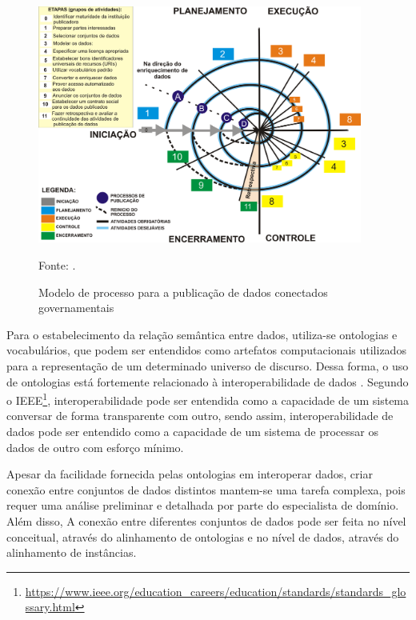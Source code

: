 \begin{figure}[!ht]
	\centering
	\includegraphics[width=0.95\textwidth]{./imagens/modelo-de-processo.png}\\
    \caption{Modelo de processo para a publicação de dados conectados governamentais}
	\footnotesize{Fonte: \cite{Avila2015}.}
	\label{fig:modelo_processo}
\end{figure}

Para o estabelecimento da relação semântica entre dados, utiliza-se ontologias e vocabulários, que podem ser entendidos como artefatos computacionais utilizados para a representação de um determinado universo de discurso. Dessa forma, o uso de ontologias está fortemente relacionado à interoperabilidade de dados \cite{guarino1998formal, simon2004using, farinelli2013papel}. Segundo o IEEE\footnote{\url{https://www.ieee.org/education_careers/education/standards/standards_glossary.html}}, interoperabilidade pode ser entendida como a capacidade de um sistema conversar de forma transparente com outro, sendo assim, interoperabilidade de dados pode ser entendido como a capacidade de um sistema de processar os dados de outro com esforço mínimo. 

Apesar da facilidade fornecida pelas ontologias em interoperar dados, criar conexão entre conjuntos de dados distintos mantem-se uma tarefa complexa, pois requer uma análise preliminar e detalhada por parte do especialista de domínio. Além disso, 
A conexão entre diferentes conjuntos de dados pode ser feita no nível conceitual, através do alinhamento de ontologias e no nível de dados, através do alinhamento de instâncias.


